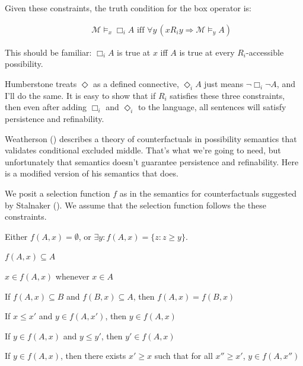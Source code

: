 \documentclass[
  11pt,
  letterpaper,
  DIV=11,
  numbers=noendperiod,
  twoside]{scrartcl}
\providecommand{\tightlist}{%
  \setlength{\itemsep}{0pt}\setlength{\parskip}{0pt}}
\begin{document}
Given these constraints, the truth condition for the box operator is:

\begin{align*}
[\Box_i] \quad & \mathcal{M} \models_x \Box_i A \text{ iff } \forall y \, (x R_i y \Rightarrow \mathcal{M} \models_y A)
\end{align*}

This should be familiar: \(\Box_i A\) is true at \(x\) iff \(A\) is true
at every \(R_i\)-accessible possibility.

Humberstone treats \(\Diamond\) as a defined connective,
\(\Diamond_i A\) just means \(\neg \Box_i \neg A\), and I'll do the
same. It is easy to show that if \(R_i\) satisfies these three
constraints, then even after adding \(\Box_i\) and \(\Diamond_i\) to the
language, all sentences will satisfy persistence and refinability.

Weatherson () describes a theory of
counterfactuals in possibility semantics that validates conditional
excluded middle. That's what we're going to need, but unfortunately that
semantics doesn't guarantee persistence and refinability. Here is a
modified version of his semantics that does.

We posit a selection function \(f\) as in the semantics for
counterfactuals suggested by Stalnaker
(). We assume that the selection
function follows the these constraints.

\begin{description}
\tightlist
\item[\textbf{Conditional Excluded Middle}]
Either \(f(A, x) = \emptyset\), or
\(\exists y: f(A, x) = \{z : z \geqslant y\}\).
\item[\textbf{Truth}]
\(f(A, x) \subseteq A\)
\item[\textbf{Centering}]
\(x \in f(A, x)\) whenever \(x \in A\)
\item[\textbf{Nearness}]
If \(f(A, x) \subseteq B\) and \(f(B, x) \subseteq A\), then
\(f(A, x) = f(B, x)\)
\item[\textbf{UpR for \(f\)}]
If \(x \leqslant x'\) and \(y \in f(A, x')\), then \(y \in f(A, x)\)
\item[\textbf{RDown for \(f\)}]
If \(y \in f(A, x)\) and \(y \leqslant y'\), then \(y' \in f(A, x)\)
\item[\textbf{RRef++ for \(f\)}]
If \(y \in f(A, x)\), then there exists \(x' \geqslant x\) such that for
all \(x'' \geqslant x'\), \(y \in f(A, x'')\)
\end{description}
\end{document}

